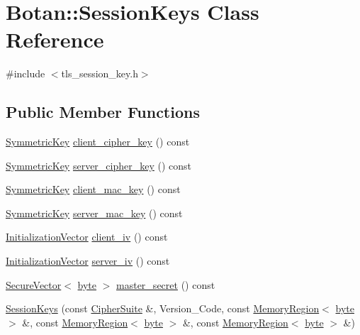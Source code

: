 \hypertarget{classBotan_1_1SessionKeys}{\section{Botan\-:\-:Session\-Keys Class Reference}
\label{classBotan_1_1SessionKeys}
}


{\ttfamily \#include $<$tls\-\_\-session\-\_\-key.\-h$>$}

\subsection*{Public Member Functions}
\begin{DoxyCompactItemize}
\item 
\hyperlink{namespaceBotan_a00c78597211d5c63b63e2a57ddb96d38}{Symmetric\-Key} \hyperlink{classBotan_1_1SessionKeys_aecc451ff7519d695063e8cccdccbe8eb}{client\-\_\-cipher\-\_\-key} () const 
\item 
\hyperlink{namespaceBotan_a00c78597211d5c63b63e2a57ddb96d38}{Symmetric\-Key} \hyperlink{classBotan_1_1SessionKeys_a4105bb9c8e887e05b3d8ab8d99e2b577}{server\-\_\-cipher\-\_\-key} () const 
\item 
\hyperlink{namespaceBotan_a00c78597211d5c63b63e2a57ddb96d38}{Symmetric\-Key} \hyperlink{classBotan_1_1SessionKeys_ab92b309462cfe07db919041fd7364525}{client\-\_\-mac\-\_\-key} () const 
\item 
\hyperlink{namespaceBotan_a00c78597211d5c63b63e2a57ddb96d38}{Symmetric\-Key} \hyperlink{classBotan_1_1SessionKeys_abb29c64e257c6b67ff884b76df8f9fc5}{server\-\_\-mac\-\_\-key} () const 
\item 
\hyperlink{namespaceBotan_ab6a07e859c4e3a2ccfd68308ec89497e}{Initialization\-Vector} \hyperlink{classBotan_1_1SessionKeys_a7d7a0dc7696a8da1b86d167e1f8d3cba}{client\-\_\-iv} () const 
\item 
\hyperlink{namespaceBotan_ab6a07e859c4e3a2ccfd68308ec89497e}{Initialization\-Vector} \hyperlink{classBotan_1_1SessionKeys_a12aec0c95ca18d113cf2e7c39a497a18}{server\-\_\-iv} () const 
\item 
\hyperlink{classBotan_1_1SecureVector}{Secure\-Vector}$<$ \hyperlink{namespaceBotan_a7d793989d801281df48c6b19616b8b84}{byte} $>$ \hyperlink{classBotan_1_1SessionKeys_a8883e8acbfb0f03f9742070a21cf2bea}{master\-\_\-secret} () const 
\item 
\hyperlink{classBotan_1_1SessionKeys_abde4dc621fae4bea185c6e2b0902cc03}{Session\-Keys} (const \hyperlink{classBotan_1_1CipherSuite}{Cipher\-Suite} \&, Version\-\_\-\-Code, const \hyperlink{classBotan_1_1MemoryRegion}{Memory\-Region}$<$ \hyperlink{namespaceBotan_a7d793989d801281df48c6b19616b8b84}{byte} $>$ \&, const \hyperlink{classBotan_1_1MemoryRegion}{Memory\-Region}$<$ \hyperlink{namespaceBotan_a7d793989d801281df48c6b19616b8b84}{byte} $>$ \&, const \hyperlink{classBotan_1_1MemoryRegion}{Memory\-Region}$<$ \hyperlink{namespaceBotan_a7d793989d801281df48c6b19616b8b84}{byte} $>$ \&)
\end{DoxyCompactItemize}


